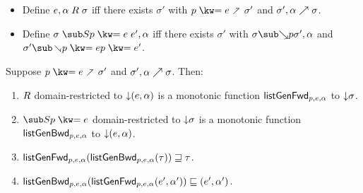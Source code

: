 \begin{lemma}
  \label{lem:aux:list-gen:gc}
  \item
  \begin{itemize}
    \item Define $e, \alpha \mathrel{R} \sigma $ iff there exists $\sigma'$ with $\clauseUncurried{p}{e} \clauseFwd \sigma'$ and ${\sigma'},{\alpha} \nearrow {\sigma}$.
    \item Define $\sigma \listGenBwd{\clauseUncurried{p}{e}} e', \alpha$ iff there exists $\sigma'$ with $\totalisebwd{\sigma}{p}{\sigma'}{\alpha}$ and $\sigma' \clauseBwd{\clauseUncurried{p}{e}} \clauseUncurried{p}{e'}$.
  \end{itemize}
  Suppose $\clauseUncurried{p}{e} \clauseFwd \sigma'$ and ${\sigma'},{\alpha} \nearrow {\sigma}$. Then:
  \begin{enumerate}
     \item $\mathrel{R}$ domain-restricted to ${\downarrow}{(e, \alpha)}$ is a monotonic function $\mathsf{listGenFwd}_{p, e, \alpha}$ to ${\downarrow}{\sigma}$.
     \item $\listGenBwd{\clauseUncurried{p}{e}}$ domain-restricted to ${\downarrow}{\sigma}$ is a monotonic function $\mathsf{listGenBwd}_{p, e, \alpha}$ to ${\downarrow}{(e, \alpha)}$.
     \item $\mathsf{listGenFwd}_{p, e, \alpha}(\mathsf{listGenBwd}_{p, e, \alpha}(\tau)) \sqsupseteq \tau$.
     \item $\mathsf{listGenBwd}_{p, e, \alpha}(\mathsf{listGenFwd}_{p, e, \alpha}(e', \alpha')) \sqsubseteq (e', \alpha')$.
  \end{enumerate}
\end{lemma}

